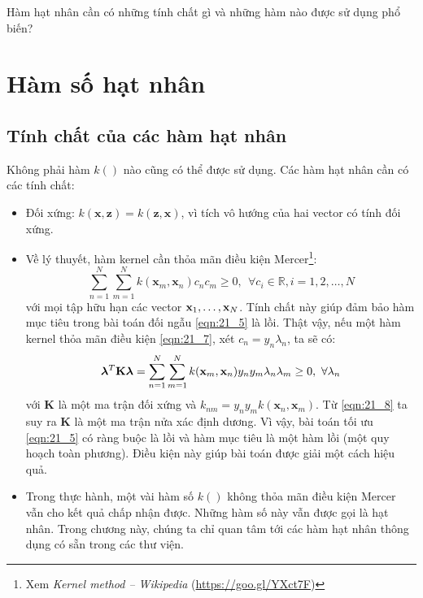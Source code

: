 Hàm hạt nhân cần có những tính chất gì và những hàm nào được sử dụng phổ biến?

\section{Hàm số hạt nhân}
\label{sec:21_kernelfns}

\subsection{Tính chất của các hàm hạt nhân }
Không phải hàm $k()$ nào cũng có thể được sử dụng. Các hàm hạt nhân cần có các tính chất:
\begin{itemize}
\item Đối xứng: $k(\mathbf{x}, \mathbf{z}) = k(\mathbf{z}, \mathbf{x})$, vì
tích vô hướng của hai vector có tính đối xứng.

\item {Về lý thuyết}, hàm kernel cần thỏa mãn điều kiện
Mercer\footnote{Xem \textit{Kernel method -- Wikipedia}
(\url{https://goo.gl/YXct7F})}:
\begin{equation}
\label{eqn:21_7}
\sum_{n=1}^N \sum_{m=1}^N k(\mathbf{x}_m, \mathbf{x}_n) c_nc_m \geq 0, ~~ \forall c_i \in \mathbb{R}, i = 1, 2, \dots, N
\end{equation}
với mọi tập hữu hạn các vector $\mathbf{x}_1, \dots, \mathbf{x}_N$.
Tính chất này giúp đảm bảo hàm mục tiêu trong bài toán đối ngẫu
\eqref{eqn:21_5} là {lồi}. Thật vậy, nếu một hàm kernel thỏa mãn điều
kiện \eqref{eqn:21_7}, xét $c_n = y_n \lambda_n$, ta sẽ có:
\begin{equation}
\label{eqn:21_8}
\boldsymbol{\lambda}^T \mathbf{K} \boldsymbol{\lambda} = \sum_{n=1}^N \sum_{m=1}^N k(\mathbf{x}_m, \mathbf{x}_n) y_ny_m \lambda_n \lambda_m \geq 0, ~\forall \lambda_n
\end{equation}
với $\mathbf{K}$ là một ma trận đối xứng và $ k_{nm} = y_ny_m k(\mathbf{x}_n, \mathbf{x}_m) $.
Từ \eqref{eqn:21_8} ta suy ra $\mathbf{K}$ là một ma trận nửa xác định dương. Vì vậy, bài toán tối ưu \eqref{eqn:21_5} có ràng buộc là lồi và hàm mục tiêu là một hàm lồi (một quy hoạch toàn phương). Điều kiện này giúp bài toán được giải một cách hiệu quả.

\item {Trong thực hành}, một vài hàm số $k()$ không thỏa mãn điều
kiện Mercer vẫn cho kết quả chấp nhận được. Những hàm số này vẫn được
gọi là hạt nhân. Trong chương này, chúng ta chỉ quan tâm tới các hàm
hạt nhân thông dụng có sẵn trong các thư viện.
\end{itemize}

